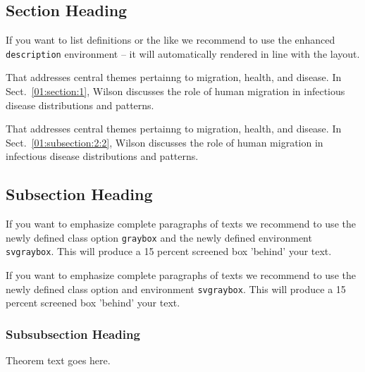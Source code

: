 \begin{bibunit}
\section{Section Heading}\label{01:section:3}


If you want to list definitions or the like we recommend to use the enhanced \verb|description| environment -- it will automatically rendered in line with the layout.

\begin{description}[Type 1]
\item[Type 1]{That addresses central themes pertainng to migration, health, and disease. In Sect.~\ref{01:section:1}, Wilson discusses the role of human migration in infectious disease distributions and patterns.}
\item[Type 2]{That addresses central themes pertainng to migration, health, and disease. In Sect.~\ref{01:subsection:2:2}, Wilson discusses the role of human migration in infectious disease distributions and patterns.}
\end{description}

\subsection{Subsection Heading}\label{01:subsection:3:1}

\lipsum

\begin{svgraybox}
If you want to emphasize complete paragraphs of texts we recommend to use the newly defined class option \verb|graybox| and the newly defined environment \verb|svgraybox|. This will produce a 15 percent screened box 'behind' your text.

If you want to emphasize complete paragraphs of texts we recommend to use the newly defined class option and environment \verb|svgraybox|. This will produce a 15 percent screened box 'behind' your text.
\end{svgraybox}


\subsubsection{Subsubsection Heading}\label{01:subsubsection:3:1:1}

\begin{theorem}
Theorem text goes here.
\end{theorem}



\end{bibunit}
